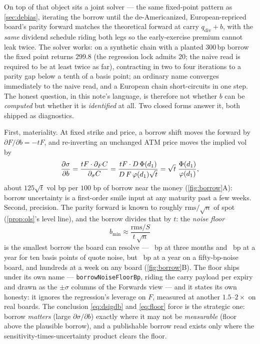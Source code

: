 \documentclass[11pt]{article}
\begin{document}
On top of that object sits a joint solver --- the same fixed-point pattern
as \cref{sec:debias}, iterating the borrow until the de-Americanized,
European-repriced board's parity forward matches the theoretical forward
at carry $q_{\mathrm{div}}+b$, with the \emph{same} dividend schedule
riding both legs so the early-exercise premium cannot leak twice.  The
solver works: on a synthetic chain with a planted $300$\,bp borrow the
fixed point returns $299.8$ (the regression lock admits $20$; the naive
read is required to be at least twice as far), contracting in two to four
iterations to a parity gap below a tenth of a basis point; an ordinary
name converges immediately to the naive read, and a European chain
short-circuits in one step.  The honest
question, in this note's language, is therefore not whether $b$ can be
\emph{computed} but whether it is \emph{identified} at
all.  Two closed forms answer it, both shipped as diagnostics.

First, materiality.  At fixed strike and price, a borrow shift moves the
forward by $\partial F/\partial b=-tF$, and re-inverting an unchanged ATM
price moves the implied vol by
\begin{equation}
\frac{\partial\sigma}{\partial b}
=\frac{tF\cdot\partial_FC}{\partial_\sigma C}
=\frac{tF\cdot D\,\Phi(d_1)}{D\,F\,\varphi(d_1)\sqrt t}
=\sqrt t\;\frac{\Phi(d_1)}{\varphi(d_1)},
\label{eq:dsigdb}
\end{equation}
about $125\sqrt t$ vol bp per $100$ bp of borrow near the money
(\cref{fig:borrow}A): borrow uncertainty is a first-order smile input at
any maturity past a few weeks.  Second, precision.  The parity forward is
known to roughly $\mathrm{rms}/\sqrt n$ of spot
(\cref{prop:ols}'s level line), and the borrow divides that by $t$: the
\emph{noise floor}
\begin{equation}
b_{\min}\approx\frac{\mathrm{rms}/S}{t\,\sqrt n}
\label{eq:floor}
\end{equation}
is the smallest borrow the board can resolve --- \fwdinfbfloorq\ bp at
three months and \fwdinfbfloory\ bp at a year for ten basis points of
quote noise, but \fwdinfbfloorwy\ bp at a year on a fifty-bp-noise board,
and hundreds at a week on any board (\cref{fig:borrow}B).  The floor
ships under its own name --- \texttt{borrowNoiseFloorBp}, riding the carry
payload per expiry and drawn as the $\pm\sigma$ columns of the Forwards
view --- and it states its own honesty: it ignores the regression's
leverage on $F$, measured at another $1.5$--$2\times$ on real boards.
The conclusion \eqref{eq:dsigdb} and \eqref{eq:floor} force is the
strategic one: borrow \emph{matters} (large $\partial\sigma/\partial b$)
exactly where it may not be \emph{measurable} (floor above the
plausible borrow), and a publishable borrow read exists only where the
sensitivity-times-uncertainty product clears the floor.
\end{document}
